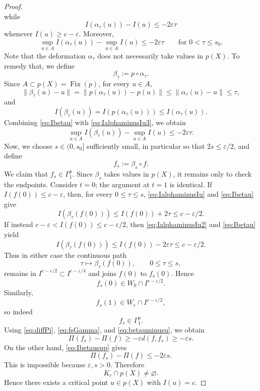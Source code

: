 \documentclass[11pt,reqno]{amsart}
\theoremstyle{plain}
\theoremstyle{definition}
\numberwithin{equation}{section}
\begin{document}
\begin{proof}
\begin{equation}
\end{equation}
while
\begin{equation}\label{eq:IalphaminusIu2}
I(\alpha_\tau(u))-I(u)\leq-2\varepsilon\tau
\end{equation}
whenever $I(u)\geq c-\varepsilon$. Moreover,
\begin{equation}\label{eq:IalphaminusIu3}
\sup_{u\in A}I(\alpha_\tau(u))-
\sup_{u\in A}I(u)
\leq-2\varepsilon\tau
\qquad\text{for }0<\tau\leq s_0.
\end{equation}
Note that the deformation $\alpha_\tau$ does not necessarily take values in $p(X)$. To remedy that, we define
$$
\beta_\tau:=p\circ\alpha_\tau.
$$
Since $A\subset p(X)=\operatorname{Fix}(p)$, for every $u\in A$,
\begin{equation}\label{eq:betauminusu}
\|\beta_\tau(u)-u\|
=\|p(\alpha_\tau(u))-p(u)\|
\leq\|\alpha_\tau(u)-u\|
\leq\tau,
\end{equation}
and
\begin{equation}\label{eq:Ibetau}
I(\beta_\tau(u))
=I(p(\alpha_\tau(u)))
\leq I(\alpha_\tau(u)).
\end{equation}
Combining \eqref{eq:Ibetau} with \eqref{eq:IalphaminusIu3}, we obtain
\begin{equation}\label{eq:Ibetausup}
\sup_{u\in A}I(\beta_\tau(u))-
\sup_{u\in A}I(u)
\leq-2\varepsilon\tau.
\end{equation}
Now, we choose $s\in(0,s_0]$ sufficiently small, in particular so that
$2s\leq\varepsilon/2$, and define
$$
f_s:=\beta_s\circ f.
$$
We claim that $f_s\in\Gamma_1^p$. Since $\beta_s$ takes values in
$p(X)$, it remains only to check the endpoints. Consider $t=0$; the
argument at $t=1$ is identical. If $I(f(0))\leq c-\varepsilon$, then,
for every $0\leq\tau\leq s$, \eqref{eq:IalphaminusIu} and
\eqref{eq:Ibetau} give
$$
I(\beta_\tau(f(0)))
\leq I(f(0))+2\tau
\leq c-\varepsilon/2.
$$
If instead $c-\varepsilon<I(f(0))\leq c-\varepsilon/2$, then
\eqref{eq:IalphaminusIu2} and \eqref{eq:Ibetau} yield
$$
I(\beta_\tau(f(0)))
\leq I(f(0))-2\varepsilon\tau
\leq c-\varepsilon/2.
$$
Thus in either case the continuous path
$$
\tau\longmapsto\beta_\tau(f(0)),
\qquad0\leq\tau\leq s,
$$
remains in $I^{c-\varepsilon/2}\subset I^{c-\varepsilon/4}$ and joins
$f(0)$ to $f_s(0)$. Hence
$$
f_s(0)\in W_0\cap I^{c-\varepsilon/2}.
$$
Similarly,
$$
f_s(1)\in W_e\cap I^{c-\varepsilon/2},
$$
so indeed
\begin{equation}\label{eq:fsGamma}
f_s\in\Gamma_1^p.
\end{equation}
Using \eqref{eq:diffPi}, \eqref{eq:fsGamma}, and
\eqref{eq:betauminusu}, we obtain
$$
\Pi(f_s)-\Pi(f)
\geq-\varepsilon d(f,f_s)
\geq-\varepsilon s.
$$
On the other hand, \eqref{eq:Ibetausup} gives
$$
\Pi(f_s)-\Pi(f)
\leq-2\varepsilon s.
$$
This is impossible because $\varepsilon,s>0$. Therefore
$$
K_c\cap p(X)\neq\varnothing.
$$
Hence there exists a critical point $u\in p(X)$ with $I(u)=c$.
\end{proof}
\end{document}
